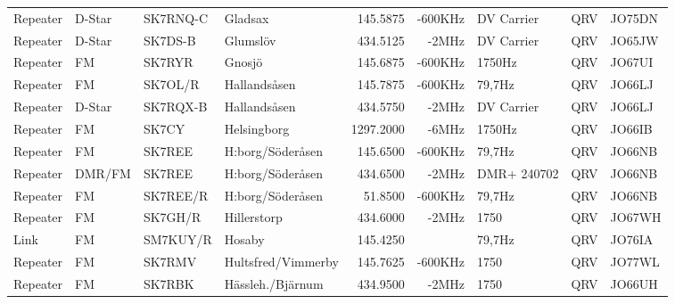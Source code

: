 \begin{landscape}
\begin{longtable}{llllrrlcl}
	Repeater          & D-Star       & SK7RNQ-C      & Gladsax             &          145.5875 &        -600KHz & DV Carrier      &       QRV       & JO75DN           \\
	Repeater          & D-Star       & SK7DS-B       & Glumslöv            &          434.5125 &          -2MHz & DV Carrier      &       QRV       & JO65JW           \\
	Repeater          & FM           & SK7RYR        & Gnosjö              &          145.6875 &        -600KHz & 1750Hz          &       QRV       & JO67UI           \\
	Repeater          & FM           & SK7OL/R       & Hallandsåsen        &          145.7875 &        -600KHz & 79,7Hz          &       QRV       & JO66LJ           \\
	Repeater          & D-Star       & SK7RQX-B      & Hallandsåsen        &          434.5750 &          -2MHz & DV Carrier      &       QRV       & JO66LJ           \\
	Repeater          & FM           & SK7CY         & Helsingborg         &         1297.2000 &          -6MHz & 1750Hz          &       QRV       & JO66IB           \\
	Repeater          & FM           & SK7REE        & H:borg/Söderåsen    &          145.6500 &        -600KHz & 79,7Hz          &       QRV       & JO66NB           \\
	Repeater          & DMR/FM       & SK7REE        & H:borg/Söderåsen    &          434.6500 &          -2MHz & DMR+ 240702     &       QRV       & JO66NB           \\
	Repeater          & FM           & SK7REE/R      & H:borg/Söderåsen    &           51.8500 &        -600KHz & 79,7Hz          &       QRV       & JO66NB           \\
	Repeater          & FM           & SK7GH/R       & Hillerstorp         &          434.6000 &          -2MHz & 1750            &       QRV       & JO67WH           \\
	Link              & FM           & SM7KUY/R      & Hosaby              &          145.4250 &                & 79,7Hz          &       QRV       & JO76IA           \\
	Repeater          & FM           & SK7RMV        & Hultsfred/Vimmerby  &          145.7625 &        -600KHz & 1750            &       QRV       & JO77WL           \\
	Repeater          & FM           & SK7RBK        & Hässleh./Bjärnum    &          434.9500 &          -2MHz & 1750            &       QRV       & JO66UH           \\

\end{longtable}
\end{landscape}
